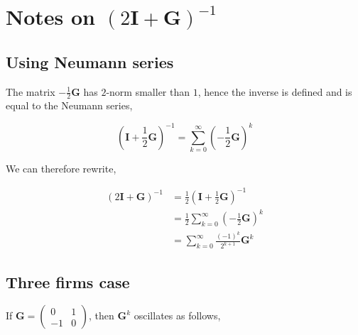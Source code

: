 \documentclass[american]{scrartcl}
\newcommand{\matr}[1]{\bm{#1}}
\begin{document}
\section{Notes on $(2\matr{I} + \matr{G})^{-1}$} \label{a:inv}
\newcommand*{\G}{\matr{G}}
\newcommand*{\I}{\matr{I}}
\newcommand*{\B}{\matr{B}}


\subsection{Using Neumann series} \label{a:neumann}

The matrix $-\frac{1}{2}\G$ has $2$-norm smaller than $1$, hence the inverse is defined and is equal to the Neumann series,

\begin{equation}
	\left(\I + \frac{1}{2} \G\right)^{-1} = \sum^{\infty}_{k = 0} \left(-\frac{1}{2} \G\right)^k
\end{equation}

We can therefore rewrite,

\begin{equation}
	\begin{split}
		(2\I + \G)^{-1} &= \frac{1}{2}\left(\I + \frac{1}{2}\G\right)^{-1} \\
		&= \frac{1}{2} \sum^{\infty}_{k = 0} \left(-\frac{1}{2} \G\right)^k \\
		&= \sum^{\infty}_{k = 0} \frac{(-1)^k}{2^{k+1}} \G^k
	\end{split}
\end{equation}

\subsection{Three firms case} \label{a:three_firms}

If $\G = \begin{pmatrix}
		0 & 1 \\ -1 & 0
	\end{pmatrix}$, then $\G^k$ oscillates as follows,
\end{document}
